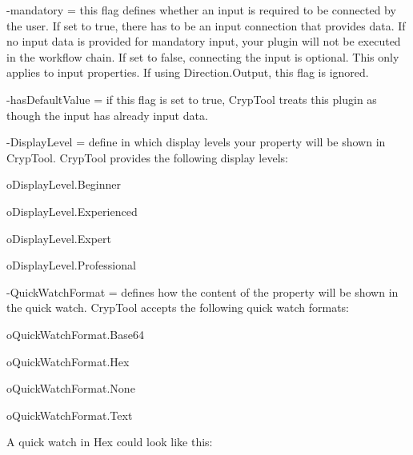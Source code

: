 \hspace{20pt}-mandatory = this flag defines whether an input is required to be connected by the user. If set to true, there has to be an input connection that provides data. If no input data is provided for mandatory input, your plugin will not be executed in the workflow chain. If set to false, connecting the input is optional. This only applies to input properties. If using Direction.Output, this flag is ignored.

\hspace{20pt}-hasDefaultValue = if this flag is set to true, CrypTool treats this plugin as though the input has already input data.

\hspace{20pt}-DisplayLevel = define in which display levels your property will be shown in CrypTool. CrypTool provides the following display levels:

\hspace{30pt}o\hspace{10pt}DisplayLevel.Beginner

\hspace{30pt}o\hspace{10pt}DisplayLevel.Experienced

\hspace{30pt}o\hspace{10pt}DisplayLevel.Expert

\hspace{30pt}o\hspace{10pt}DisplayLevel.Professional

\hspace{20pt}-QuickWatchFormat = defines how the content of the property will be shown in the quick watch. CrypTool accepts the following quick watch formats:

\hspace{30pt}o\hspace{10pt}QuickWatchFormat.Base64

\hspace{30pt}o\hspace{10pt}QuickWatchFormat.Hex

\hspace{30pt}o\hspace{10pt}QuickWatchFormat.None

\hspace{30pt}o\hspace{10pt}QuickWatchFormat.Text

A quick watch in Hex could look like this:

